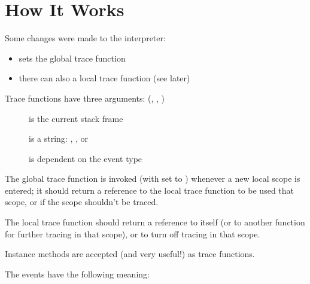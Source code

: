 \section{How It Works}

Some changes were made to the interpreter:

\begin{itemize}
\item {} sets the global trace function
\item there can also a local trace function (see later)
\end{itemize}

Trace functions have three arguments: (, , )

\begin{description}

\item[] is the current stack frame

\item[] is a string: , , 
or 

\item[] is dependent on the event type

\end{description}

The global trace function is invoked (with  set to
) whenever a new local scope is entered; it should return
a reference to the local trace function to be used that scope, or
 if the scope shouldn't be traced.

The local trace function should return a reference to itself (or to
another function for further tracing in that scope), or  to
turn off tracing in that scope.

Instance methods are accepted (and very useful!) as trace functions.

The events have the following meaning:

